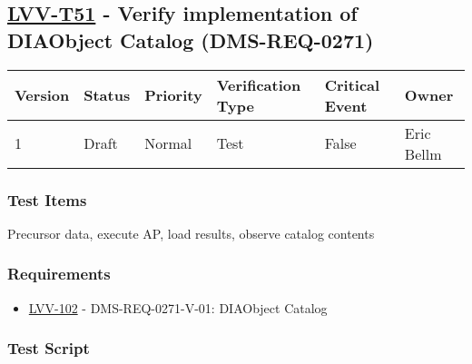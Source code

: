 \hypertarget{lvv-t51---verify-implementation-of-diaobject-catalog-dms-req-0271}{%
\subsection{\texorpdfstring{\href{https://jira.lsstcorp.org/secure/Tests.jspa\#/testCase/LVV-T51}{LVV-T51}
- Verify implementation of DIAObject Catalog
(DMS-REQ-0271)}{LVV-T51 - Verify implementation of DIAObject Catalog (DMS-REQ-0271)}}\label{lvv-t51---verify-implementation-of-diaobject-catalog-dms-req-0271}}

\begin{longtable}[]{@{}llllll@{}}
\toprule
Version & Status & Priority & Verification Type & Critical Event &
Owner\tabularnewline
\midrule
\endhead
1 & Draft & Normal & Test & False & Eric Bellm\tabularnewline
\bottomrule
\end{longtable}

\hypertarget{test-items-27}{%
\subsubsection{Test Items}\label{test-items-27}}

Precursor data, execute AP, load results, observe catalog contents

\hypertarget{requirements-28}{%
\subsubsection{Requirements}\label{requirements-28}}

\begin{itemize}
\tightlist
\item
  \href{https://jira.lsstcorp.org/browse/LVV-102}{LVV-102} -
  DMS-REQ-0271-V-01: DIAObject Catalog
\end{itemize}

\hypertarget{test-script-28}{%
\subsubsection{Test Script}\label{test-script-28}}

